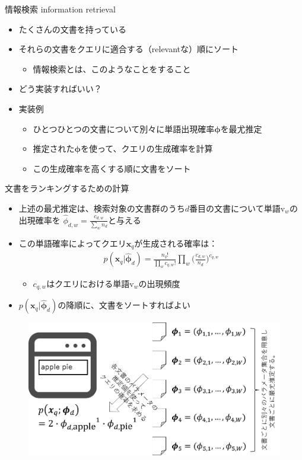 \documentclass[aspectratio=169,unicode,dvipdfmx,14pt]{beamer}
\begin{document}
\begin{frame}{情報検索 information retrieval}
\begin{itemize}
\item たくさんの文書を持っている
\item それらの文書をクエリに適合する（relevantな）順にソート
\begin{itemize}
\item 情報検索とは、このようなことをすること
\end{itemize}
\item どう実装すればいい？
\item 実装例
\begin{itemize}
\item ひとつひとつの文書について別々に単語出現確率$\bm{\phi}$を最尤推定
\item 推定された$\bm{\phi}$を使って、クエリの生成確率を計算
\item この生成確率を高くする順に文書をソート
\end{itemize}
\end{itemize}
\end{frame}

\begin{frame}{文書をランキングするための計算}
\begin{itemize}
\item 上述の最尤推定は、検索対象の文書群のうち$d$番目の文書について単語$\mbox{v}_w$の出現確率を
$\hat{\phi}_{d,w} = \frac{c_{d,w}}{\sum_w n_d}$と与える
\item この単語確率によってクエリ$\bm{x}_q$が生成される確率は：
\begin{align}
p(\bm{x}_q | \hat{\bm{\phi}}_d) = \frac{n_q!}{\prod_w c_{q,w}!} \prod_w \bigg( \frac{c_{d,w}}{n_d} \bigg)^{c_{q,w}}
\end{align}
\begin{itemize}
\item $c_{q,w}$はクエリにおける単語$\mbox{v}_w$の出現頻度
\end{itemize}
\item $p(\bm{x}_q | \hat{\bm{\phi}}_d)$の降順に、文書をソートすればよい
\end{itemize}
\end{frame}

\begin{frame}
\begin{figure}[htbp]
\begin{center}
\includegraphics[scale=0.42]{information_retrieval.png}
\label{}
\end{center}
\end{figure}
\end{frame}
\end{document}
